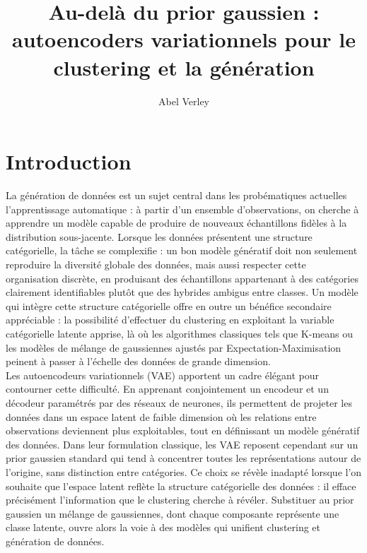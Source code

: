 \documentclass{article}
\title{\textbf{Au-delà du prior gaussien : autoencoders variationnels pour le clustering et la génération}}
\date{}
\author{Abel Verley}
\begin{document}
\maketitle


\section{Introduction}
    La génération de données est un sujet central dans les probématiques actuelles l'apprentissage automatique : à partir d'un ensemble d'observations, on cherche à apprendre un modèle capable de produire de nouveaux échantillons fidèles à la distribution sous-jacente. Lorsque les données présentent une structure catégorielle, la tâche se complexifie : un bon modèle génératif doit non seulement reproduire la diversité globale des données, mais aussi respecter cette organisation discrète, en produisant des échantillons appartenant à des catégories clairement identifiables plutôt que des hybrides ambigus entre classes. Un modèle qui intègre cette structure catégorielle offre en outre un bénéfice secondaire appréciable : la possibilité d'effectuer du clustering en exploitant la variable catégorielle latente apprise, là où les algorithmes classiques tels que K-means ou les modèles de mélange de gaussiennes ajustés par Expectation-Maximisation peinent à passer à l'échelle des données de grande dimension.\\

    Les autoencodeurs variationnels (VAE) \cite{kingmaAutoEncodingVariationalBayes2022} apportent un cadre élégant pour contourner cette difficulté. En apprenant conjointement un encodeur et un décodeur paramétrés par des réseaux de neurones, ils permettent de projeter les données dans un espace latent de faible dimension où les relations entre observations deviennent plus exploitables, tout en définissant un modèle génératif des données. Dans leur formulation classique, les VAE reposent cependant sur un prior gaussien standard qui tend à concentrer toutes les représentations autour de l'origine, sans distinction entre catégories. Ce choix se révèle inadapté lorsque l'on souhaite que l'espace latent reflète la structure catégorielle des données : il efface précisément l'information que le clustering cherche à révéler. Substituer au prior gaussien un mélange de gaussiennes, dont chaque composante représente une classe latente, ouvre alors la voie à des modèles qui unifient clustering  et génération de données.\\
\end{document}

